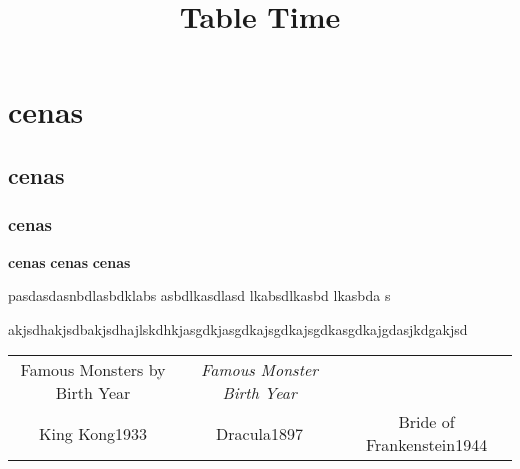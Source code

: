 \documentclass[10pt]{article}
\title{Table Time}
\begin{document}
\section*{cenas}
\subsection*{cenas}
\subsubsection*{cenas}
\textbf{cenas}
\textbf{cenas}
\textbf{cenas}


 pasdasdasnbdlasbdklabs asbdlkasdlasd lkabsdlkasbd lkasbda s


 akjsdhakjsdbakjsdhajlskdhkjasgdkjasgdkajsgdkajsgdkasgdkajgdasjkdgakjsd


\begin{tabular}{ccc}
Famous Monsters by Birth Year &\emph{Famous Monster}
\emph{Birth Year}
 & \\
King Kong1933 &Dracula1897 &Bride of Frankenstein1944

\end{tabular}
\end{document}
